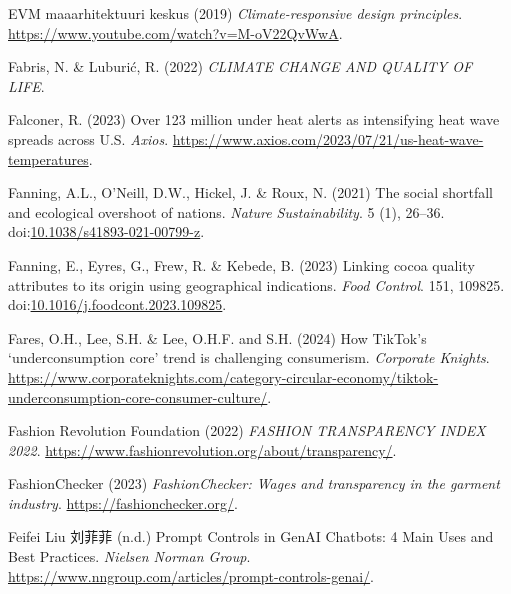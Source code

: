 \documentclass[
  letterpaper,
  DIV=11,
  numbers=noendperiod]{scrartcl}
\newlength{\cslhangindent}
\newenvironment{CSLReferences}[2] %
 {\begin{list}{}{%
  \setlength{\itemindent}{0pt}
  \setlength{\leftmargin}{0pt}
  \setlength{\parsep}{0pt}
  \ifodd #1
   \setlength{\leftmargin}{\cslhangindent}
   \setlength{\itemindent}{-1\cslhangindent}
  \fi
  \setlength{\itemsep}{#2\baselineskip}}}
 {\end{list}}
\begin{document}
\begin{CSLReferences}{0}{1}
EVM maaarhitektuuri keskus (2019) \emph{Climate-responsive design
principles}. \url{https://www.youtube.com/watch?v=M-oV22QvWwA}.

Fabris, N. \& Luburić, R. (2022) \emph{{CLIMATE CHANGE AND QUALITY OF
LIFE}}.

Falconer, R. (2023) Over 123 million under heat alerts as intensifying
heat wave spreads across {U}.{S}. \emph{Axios}.
\url{https://www.axios.com/2023/07/21/us-heat-wave-temperatures}.

Fanning, A.L., O'Neill, D.W., Hickel, J. \& Roux, N. (2021) The social
shortfall and ecological overshoot of nations. \emph{Nature
Sustainability}. 5 (1), 26--36.
doi:\href{https://doi.org/10.1038/s41893-021-00799-z}{10.1038/s41893-021-00799-z}.

Fanning, E., Eyres, G., Frew, R. \& Kebede, B. (2023) Linking cocoa
quality attributes to its origin using geographical indications.
\emph{Food Control}. 151, 109825.
doi:\href{https://doi.org/10.1016/j.foodcont.2023.109825}{10.1016/j.foodcont.2023.109825}.

Fares, O.H., Lee, S.H. \& Lee, O.H.F. and S.H. (2024) How {TikTok}'s
{`underconsumption core'} trend is challenging consumerism.
\emph{Corporate Knights}.
\url{https://www.corporateknights.com/category-circular-economy/tiktok-underconsumption-core-consumer-culture/}.

Fashion Revolution Foundation (2022) \emph{{FASHION TRANSPARENCY INDEX}
2022}. \url{https://www.fashionrevolution.org/about/transparency/}.

FashionChecker (2023) \emph{{FashionChecker}: Wages and transparency in
the garment industry}. \url{https://fashionchecker.org/}.

Feifei Liu 刘菲菲 (n.d.) Prompt {Controls} in {GenAI Chatbots}: 4 {Main
Uses} and {Best Practices}. \emph{Nielsen Norman Group}.
\url{https://www.nngroup.com/articles/prompt-controls-genai/}.


\end{CSLReferences}
\end{document}

